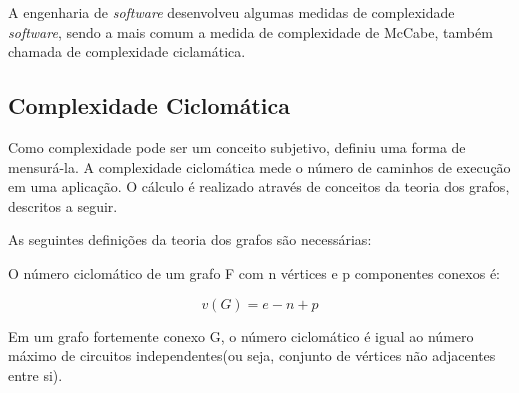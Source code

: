 A engenharia de \textit{software} desenvolveu algumas medidas de complexidade \textit{software}, sendo a mais comum a medida de complexidade de McCabe, também chamada de complexidade ciclamática. 
\subsection{ Complexidade Ciclomática } \label{subsec:complexidade_ciclomatica}

Como complexidade pode ser um conceito subjetivo, \cite{mccabe1976complexity} definiu uma forma de mensurá-la. A complexidade ciclomática mede o número de caminhos de execução em uma aplicação. O cálculo é realizado através de conceitos da teoria dos grafos, descritos a seguir.

As seguintes definições da teoria dos grafos são necessárias:
\begin{definition}
O número ciclomático de um grafo F com n vértices e p componentes conexos é:
\end{definition}
\[ v(G) = e - n + p \]
\begin{theorem}
Em um grafo fortemente conexo G, o número ciclomático é igual ao número máximo de circuitos independentes(ou seja, conjunto de vértices não adjacentes entre si). 
\end{theorem}

